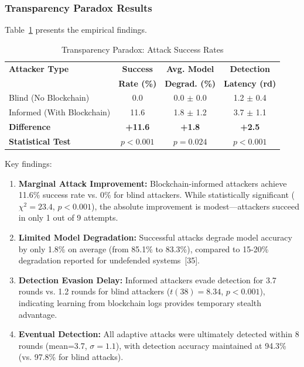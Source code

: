 \documentclass[12pt,a4paper,onecolumn]{article}
\begin{document}
\subsubsection{Transparency Paradox Results}

Table~\ref{tab:transparency_paradox} presents the empirical findings.

\begin{table}[t]
\caption{Transparency Paradox: Attack Success Rates}
\label{tab:transparency_paradox}
\centering
\begin{tabular}{lccc}
\toprule
\textbf{Attacker Type} & \textbf{Success} & \textbf{Avg. Model} & \textbf{Detection} \\
& \textbf{Rate (\%)} & \textbf{Degrad. (\%)} & \textbf{Latency (rd)} \\
\midrule
Blind (No Blockchain) & 0.0 & 0.0 $\pm$ 0.0 & 1.2 $\pm$ 0.4 \\
Informed (With Blockchain) & 11.6 & 1.8 $\pm$ 1.2 & 3.7 $\pm$ 1.1 \\
\midrule
\textbf{Difference} & \textbf{+11.6} & \textbf{+1.8} & \textbf{+2.5} \\
\textbf{Statistical Test} & $p<0.001$ & $p=0.024$ & $p<0.001$ \\
\bottomrule
\end{tabular}
\end{table}

Key findings:

\begin{enumerate}
    \item \textbf{Marginal Attack Improvement:} Blockchain-informed attackers achieve 11.6\% success rate vs. 0\% for blind attackers. While statistically significant ($\chi^2=23.4$, $p<0.001$), the absolute improvement is modest---attackers succeed in only 1 out of 9 attempts.
    
    \item \textbf{Limited Model Degradation:} Successful attacks degrade model accuracy by only 1.8\% on average (from 85.1\% to 83.3\%), compared to 15-20\% degradation reported for undefended systems~[35].
    
    \item \textbf{Detection Evasion Delay:} Informed attackers evade detection for 3.7 rounds vs. 1.2 rounds for blind attackers ($t(38)=8.34$, $p<0.001$), indicating learning from blockchain logs provides temporary stealth advantage.
    
    \item \textbf{Eventual Detection:} All adaptive attacks were ultimately detected within 8 rounds (mean=3.7, $\sigma=1.1$), with detection accuracy maintained at 94.3\% (vs. 97.8\% for blind attacks).
\end{enumerate}
\end{document}
